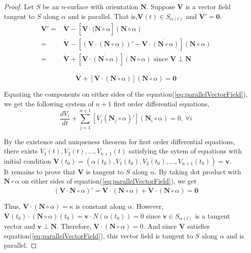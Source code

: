 \begin{proof}
	Let $S$ be an $n$-surface with orientation $\boldsymbol{N}$.
	Suppose $\boldsymbol{V}$ is a vector field tangent to $S$ along $\alpha$ and is parallel.
	That is,$\boldsymbol{V}(t) \in S_{\alpha(t)}$ and $\boldsymbol{V}' = \boldsymbol{0}$.
\begin{align*}
	\boldsymbol{V}' = & \dot{\boldsymbol{V}} - \left[ \dot{\boldsymbol{V}} \cdot (\boldsymbol{N} \circ \alpha \right] (\boldsymbol{N} \circ \alpha) \\
	= & \dot{\boldsymbol{V}} - \left[ \left(\boldsymbol{V} \cdot (\boldsymbol{N} \circ \alpha) \right)' - \boldsymbol{V} \cdot \dot{(\boldsymbol{N} \circ \alpha)} \right] (\boldsymbol{N} \circ \alpha) \\
	= & \dot{\boldsymbol{V}} + \left[ \boldsymbol{V} \cdot \dot{(\boldsymbol{N} \circ \alpha)} \right] (\boldsymbol{N} \circ \alpha) \text{ since } \boldsymbol{V} \perp \boldsymbol{N}
\end{align*}

\begin{equation}
	\dot{\boldsymbol{V}} + \left[ \boldsymbol{V} \cdot (\boldsymbol{N} \dot{\circ} \alpha) \right] (\boldsymbol{N} \circ \alpha) = \boldsymbol{0}
	\label{eq:parallelVectorField}
\end{equation}

	Equating the components on either sides of the equation(\ref{eq:parallelVectorField}), we get the following system of $n+1$ first order differential equations,
\begin{equation}
	\dfrac{dV_i}{dt} + \sum_{j = 1}^{n+1} \left[ V_j(\boldsymbol{N}_j \circ \alpha)' \right](\boldsymbol{N}_i \circ \alpha) = 0,\ \forall i
\end{equation}
	
	By the existence and uniqueness theorem for first order differential equations, there exists $V_1(t), V_2(t), \dots, V_{n+1}(t)$ satisfying the sytem of equations with initial condition $\boldsymbol{V}(t_0) = \left( \alpha(t_0), V_1(t_0), V_2(t_0),\dots,V_{n+1}(t_0) \right) = \boldsymbol{v}$.\\


	It remains to prove that $\boldsymbol{V}$ is tangent to $S$ along $\alpha$.
	By taking dot product with $\boldsymbol{N} \circ \alpha$ on either sides of equation(\ref{eq:parallelVectorField}), we get
\begin{equation}
	(\boldsymbol{V} \cdot \boldsymbol{N} \circ \alpha)'= \dot{\boldsymbol{V}} \cdot (\boldsymbol{N} \circ \alpha) + \boldsymbol{V} \cdot (\boldsymbol{N} \dot{\circ} \alpha) = \boldsymbol{0}
\end{equation}

	Thus, $\boldsymbol{V} \cdot (\boldsymbol{N} \circ \alpha) = \kappa$ is constant along $\alpha$.
	However, $\boldsymbol{V}(t_0) \cdot (\boldsymbol{N} \circ \alpha)(t_0) = \boldsymbol{v} \cdot N(\alpha(t_0)) = 0$ since $\boldsymbol{v} \in S_{\alpha(t)}$ is a tangent vector and $\boldsymbol{v} \perp \boldsymbol{N}$.
	Therefore, $\boldsymbol{V} \cdot (\boldsymbol{N} \circ \alpha) = 0$.
	And since $\boldsymbol{V}$ satisfies equation(\ref{eq:parallelVectorField}), this vector field is tangent to $S$ along $\alpha$ and is parallel.
\end{proof}

